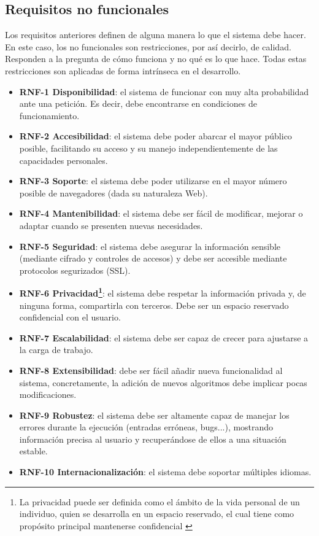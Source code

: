 \subsection{Requisitos no funcionales}
Los requisitos anteriores definen de alguna manera lo que el sistema debe hacer.
En este caso, los no funcionales son restricciones, por así decirlo, de calidad.
Responden a la pregunta de cómo funciona y no qué es lo que hace. Todas estas
restricciones son aplicadas de forma intrínseca en el desarrollo.

\begin{itemize}
	\item \textbf{RNF-1 Disponibilidad}: el sistema de funcionar con muy alta
	probabilidad ante una petición. Es decir, debe encontrarse en condiciones de
	funcionamiento.
	\item \textbf{RNF-2 Accesibilidad}: el sistema debe poder abarcar el mayor
	público posible, facilitando su acceso y su manejo independientemente de las
	capacidades personales.
    \item \textbf{RNF-3 Soporte}: el sistema debe poder utilizarse en el mayor
    número posible de navegadores (dada su naturaleza Web).
	\item \textbf{RNF-4 Mantenibilidad}: el sistema debe ser fácil de modificar,
	mejorar o adaptar cuando se presenten nuevas necesidades.
	\item \textbf{RNF-5 Seguridad}: el sistema debe asegurar la información
	sensible (mediante cifrado y controles de accesos) y debe ser accesible
	mediante protocolos segurizados (SSL).
	\item \textbf{RNF-6 Privacidad\footnote{La privacidad puede ser definida
	como el ámbito de la vida personal de un individuo, quien se desarrolla en
	un espacio reservado, el cual tiene como propósito principal mantenerse
	confidencial \cite{eswiki:148719517}}}: el sistema debe respetar la
	información privada y, de ninguna forma, compartirla con terceros. Debe ser
	un espacio reservado confidencial con el usuario.
	\item \textbf{RNF-7 Escalabilidad}: el sistema debe ser capaz de crecer para
	ajustarse a la carga de trabajo.
	\item \textbf{RNF-8 Extensibilidad}: debe ser fácil añadir nueva
	funcionalidad al sistema, concretamente, la adición de nuevos algoritmos
	debe implicar pocas modificaciones.
	\item \textbf{RNF-9 Robustez}: el sistema debe ser altamente capaz de
	manejar los errores durante la ejecución (entradas erróneas, bugs...),
	mostrando información precisa al usuario y recuperándose de ellos a una
	situación estable.
	\item \textbf{RNF-10 Internacionalización}: el sistema debe soportar múltiples idiomas.

\end{itemize}

